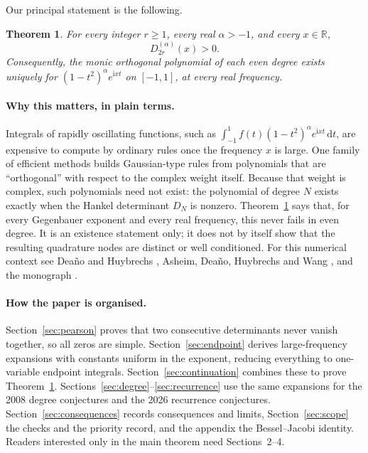 \documentclass[11pt]{article}
\numberwithin{equation}{section}
\newtheorem{theorem}{Theorem}[section]
\theoremstyle{remark}
\newcommand{\ii}{\mathrm{i}}
\newcommand{\dd}{\,\mathrm{d}}
\newcommand{\R}{\mathbb{R}}
\begin{document}
Our principal statement is the following.

\begin{theorem}\label{thm:main}
For every integer $r\ge1$, every real $\alpha>-1$, and every $x\in\R$,
\begin{equation}\label{eq:main}
                         D_{2r}^{(\alpha)}(x)>0.
\end{equation}
Consequently, the monic orthogonal polynomial of each even degree exists
uniquely for $(1-t^2)^\alpha e^{\ii xt}$ on $[-1,1]$, at every real frequency.
\end{theorem}

\paragraph{Why this matters, in plain terms.}
Integrals of rapidly oscillating functions, such as
$\int_{-1}^1f(t)(1-t^2)^\alpha e^{\ii xt}\dd t$, are expensive to compute
by ordinary rules once the frequency $x$ is large. One family of
efficient methods builds Gaussian-type rules from polynomials that are
``orthogonal'' with respect to the complex weight itself. Because that
weight is complex, such polynomials need not exist: the polynomial of
degree $N$ exists exactly when the Hankel determinant $D_N$ is nonzero.
Theorem~\ref{thm:main} says that, for every Gegenbauer exponent and every
real frequency, this never fails in even degree. It is an existence
statement only; it does not by itself show that the resulting quadrature
nodes are distinct or well conditioned. For this numerical context see
Deaño and Huybrechs \cite{DeanoHuybrechs2009}, Asheim, Deaño, Huybrechs
and Wang \cite{ADHW2014}, and the monograph \cite{DHI2017}.

\paragraph{How the paper is organised.}
Section~\ref{sec:pearson} proves that two consecutive determinants never
vanish together, so all zeros are simple. Section~\ref{sec:endpoint}
derives large-frequency expansions with constants uniform in the
exponent, reducing everything to one-variable endpoint integrals.
Section~\ref{sec:continuation} combines these to prove
Theorem~\ref{thm:main}. Sections~\ref{sec:degree}--\ref{sec:recurrence}
use the same expansions for the 2008 degree conjectures and the 2026
recurrence conjectures. Section~\ref{sec:consequences} records
consequences and limits, Section~\ref{sec:scope} the checks and the
priority record, and the appendix the Bessel--Jacobi identity. Readers
interested only in the main theorem need Sections~2--4.
\end{document}
